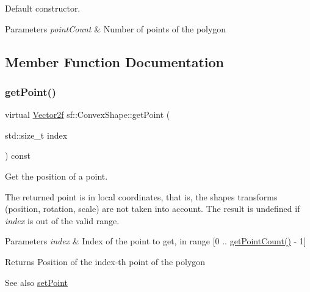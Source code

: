 Default constructor. 


\begin{DoxyParams}{Parameters}
{\em point\+Count} & Number of points of the polygon \\
\hline
\end{DoxyParams}


\subsection{Member Function Documentation}
\mbox{\label{classsf_1_1_convex_shape_a72a97bc426d8daf4d682a20fcb7f3fe7}} 
\subsubsection{\texorpdfstring{get\+Point()}{getPoint()}}
{\footnotesize\ttfamily virtual \hyperlink{classsf_1_1_vector2}{Vector2f} sf\+::\+Convex\+Shape\+::get\+Point (\begin{DoxyParamCaption}\item[{std\+::size\+\_\+t}]{index }\end{DoxyParamCaption}) const\hspace{0.3cm}{\ttfamily [virtual]}}



Get the position of a point. 

The returned point is in local coordinates, that is, the shape\textquotesingle{}s transforms (position, rotation, scale) are not taken into account. The result is undefined if {\itshape index} is out of the valid range.


\begin{DoxyParams}{Parameters}
{\em index} & Index of the point to get, in range \mbox{[}0 .. \hyperlink{classsf_1_1_convex_shape_a0c54b8d48fe4e13414f6e667dbfc22a3}{get\+Point\+Count()} -\/ 1\mbox{]}\\
\hline
\end{DoxyParams}
\begin{DoxyReturn}{Returns}
Position of the index-\/th point of the polygon
\end{DoxyReturn}
\begin{DoxySeeAlso}{See also}
\hyperlink{classsf_1_1_convex_shape_a5929e0ab0ba5ca1f102b40c234a8e92d}{set\+Point} 
\end{DoxySeeAlso}


